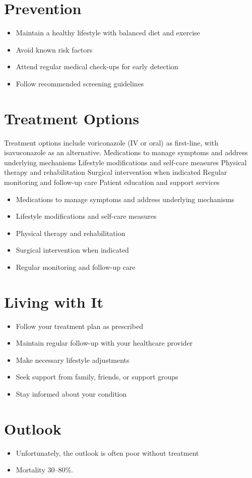 \section{Prevention}
\begin{itemize}[noitemsep]
  \item Maintain a healthy lifestyle with balanced diet and exercise
  \item Avoid known risk factors
  \item Attend regular medical check-ups for early detection
  \item Follow recommended screening guidelines
\end{itemize}
\section{Treatment Options}
Treatment options include voriconazole (IV or oral) as first-line, with isavuconazole as an alternative. Medications to manage symptoms and address underlying mechanisms Lifestyle modifications and self-care measures Physical therapy and rehabilitation Surgical intervention when indicated Regular monitoring and follow-up care Patient education and support services

\begin{itemize}[noitemsep]
  \item Medications to manage symptoms and address underlying mechanisms
  \item Lifestyle modifications and self-care measures
  \item Physical therapy and rehabilitation
  \item Surgical intervention when indicated
  \item Regular monitoring and follow-up care
\end{itemize}
\section{Living with It}
\begin{itemize}[noitemsep]
  \item Follow your treatment plan as prescribed
  \item Maintain regular follow-up with your healthcare provider
  \item Make necessary lifestyle adjustments
  \item Seek support from family, friends, or support groups
  \item Stay informed about your condition
\end{itemize}
\section{Outlook}
\begin{itemize}[noitemsep]
  \item Unfortunately, the outlook is often poor without treatment
  \item Mortality 30--80\%.
\end{itemize}
